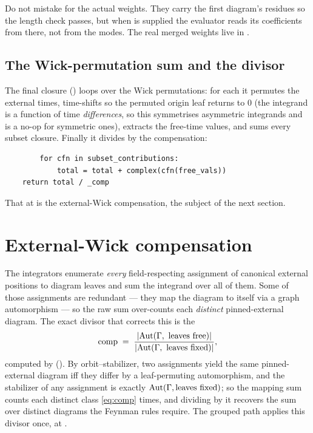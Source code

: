 \begin{gotcha}
Do not mistake  for the actual weights. They carry the
first diagram's residues so the  length check passes, but when
 is supplied the evaluator reads its coefficients from there,
not from the modes. The real merged weights live in .
\end{gotcha}

\subsection{The Wick-permutation sum and the divisor}

The final  closure
() loops over the Wick permutations: for
each it permutes the external times, time-shifts so the permuted origin leaf
returns to $0$ (the integrand is a function of time \emph{differences}, so this
symmetrises asymmetric integrands and is a no-op for symmetric ones), extracts the
free-time values, and sums every subset closure. Finally it divides by the
compensation:
\begin{lstlisting}
        for cfn in subset_contributions:
            total = total + complex(cfn(free_vals))
    return total / _comp
\end{lstlisting}
That  at  is the external-Wick
compensation, the subject of the next section.

\section{External-Wick compensation}\label{sec:compensation}

The integrators enumerate \emph{every} field-respecting assignment of canonical
external positions to diagram leaves and sum the integrand over all of them. Some
of those assignments are redundant --- they map the diagram to itself via a graph
automorphism --- so the raw sum over-counts each \emph{distinct} pinned-external
diagram. The exact divisor that corrects this is the 
\begin{equation}
  \mathrm{comp}
  \;=\;
  \frac{|\mathrm{Aut}(\Gamma,\ \text{leaves free})|}{|\mathrm{Aut}(\Gamma,\ \text{leaves fixed})|},
  \label{eq:comp}
\end{equation}
computed by  (). By
orbit--stabilizer, two assignments yield the same pinned-external diagram iff they
differ by a leaf-permuting automorphism, and the stabilizer of any assignment is
exactly $\mathrm{Aut}(\Gamma, \text{leaves fixed})$; so the mapping sum counts each
distinct class \eqref{eq:comp} times, and dividing by it recovers the sum over
distinct diagrams the Feynman rules require. The grouped path applies this divisor
once, at .

